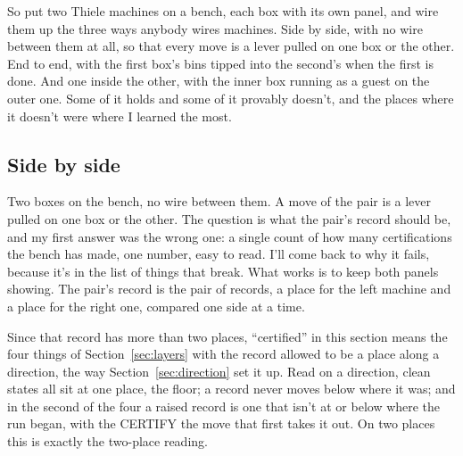 \documentclass[11pt,twoside]{article}
\theoremstyle{thielethm}
\theoremstyle{thieledef}
\theoremstyle{thieledef}
\theoremstyle{thieledef}
\theoremstyle{thielethm}
\theoremstyle{thieleobs}
\theoremstyle{thielethm}
\begin{document}
So put two Thiele machines on a bench, each box with its own panel, and wire them up the three ways
anybody wires machines. Side by side, with no wire between them at all, so that every move is a lever
pulled on one box or the other. End to end, with the first box's bins tipped into the second's when
the first is done. And one inside the other, with the inner box running as a guest on the outer one.
Some of it holds and some of it provably doesn't, and the places where it doesn't were where I learned
the most.

\subsection{Side by side}

Two boxes on the bench, no wire between them. A move of the pair is a lever pulled on one box or the
other. The question is what the pair's record should be, and my first answer was the wrong one: a
single count of how many certifications the bench has made, one number, easy to read. I'll come back
to why it fails, because it's in the list of things that break. What works is to keep both panels
showing. The pair's record is the pair of records, a place for the left machine and a place for the
right one, compared one side at a time.

Since that record has more than two places, ``certified'' in this section means the four things
of Section~\ref{sec:layers} with the record allowed to be a place along a direction, the way
Section~\ref{sec:direction} set it up. Read on a direction, clean states all sit at one place, the floor; a record never moves below where it was; and in the second of the four a raised record is one that isn't at or below where the run began, with the CERTIFY the move that first takes it out. On two places this is exactly the two-place reading.
\end{document}
